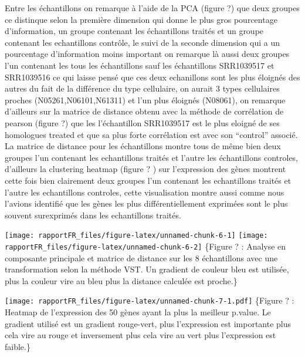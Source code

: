 \documentclass[
  12pt,
]{article}
\begin{document}
\par

Entre les échantillons on remarque à l'aide de la PCA (figure ?) que
deux groupes ce distinque selon la première dimension qui donne le plus
gros pourcentage d'information, un groupe contenant les échantillons
traités et un groupe contenant les echantillons contrôle, le suivi de la
seconde dimension qui a un pourcentage d'information moins important on
remarque là aussi deux groupes l'un contenant les tous les échantillons
sauf les échantillons SRR1039517 et SRR1039516 ce qui laisse pensé que
ces deux echanillons sont les plus éloignés des autres du fait de la
différence du type cellulaire, on aurait 3 types cellulaires proches
(N05261,N06101,N61311) et l'un plus éloignés (N08061), on remarque
d'ailleurs sur la matrice de distance obtenu avec la méthode de
corrélation de pearson (figure ?) que les l'échantillon SRR1039517 est
le plus eloigné de ses homologues treated et que sa plus forte
corrélation est avec son ``control'' associé. La matrice de distance
pour les échantillons montre tous de même bien deux groupes l'un
contenant les echantillons traités et l'autre les échantillons
controles, d'ailleurs la clustering heatmap (figure ? ) sur l'expression
des gènes montrent cette fois bien clairement deux groupes l'un
contenant les echantillons traités et l'autre les echantillons
controles, cette visualisation montre aussi comme nous l'avions
identifié que les gènes les plus différentiellement exprimées sont le
plus souvent surexprimés dans les echantillons traités.

\singlespacing

\texttt{[image: rapportFR\_files/figure-latex/unnamed-chunk-6-1]}
\texttt{[image: rapportFR\_files/figure-latex/unnamed-chunk-6-2]}
\sffamily\small\{Figure ? : Analyse en composante principale et matrice
de distance sur les 8 échantillons avec une transformation selon la
méthode VST. Un gradient de couleur bleu est utilisée, plus la couleur
vire au bleu plus la distance calculée est proche.\} \normalsize


\singlespacing

\texttt{[image: rapportFR\_files/figure-latex/unnamed-chunk-7-1.pdf]}
\sffamily\small\{Figure ? : Heatmap de l'expression des 50 gènes ayant
la plus la meilleur p.value. Le gradient utilisé est un gradient
rouge-vert, plus l'expression est importante plus cela vire au rouge et
inversement plus cela vire au vert plus l'expression est faible.\}
\normalsize
\end{document}

